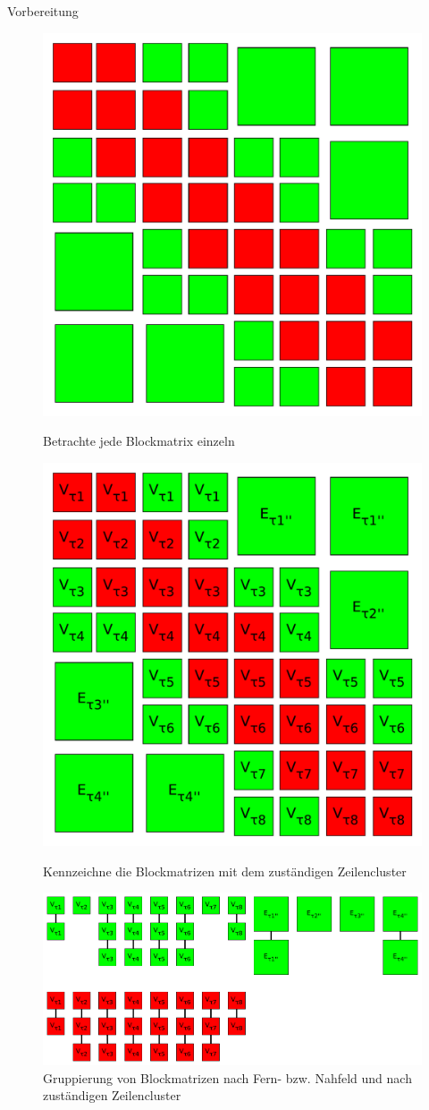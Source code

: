 \documentclass[10pt]{beamer}
\begin{document}
\begin{frame}{Vorbereitung}\vfill
  \begin{figure}
    \begin{overprint}
        \centering
        \includegraphics[width=.66\linewidth]{figures/fg-h2-matrix-block.pdf}
        \caption{Betrachte jede Blockmatrix einzeln}
        \centering
        \includegraphics[width=.66\linewidth]{figures/fg-h2-matrix-block-labled.pdf}
        \caption{Kennzeichne die Blockmatrizen mit dem zust\"andigen Zeilencluster}
        \centering
        \includegraphics[width=\linewidth]{figures/fg-h2-matrix-block-orderd.pdf}
        \caption{Gruppierung von Blockmatrizen nach Fern- bzw. Nahfeld und nach
                 zust\"andigen Zeilencluster}
    \end{overprint}
  \end{figure}
\end{frame}
\end{document}
